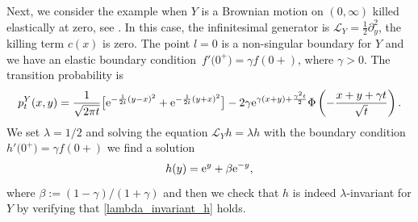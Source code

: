 \documentclass[pdftex]{sigma}
\numberwithin{equation}{section}
\theoremstyle{definition}
\def\L{{\mathcal L}}
\begin{document}
Next, we consider the example when $Y$ is a Brownian motion on $(0,\infty)$ killed elastically at zero,
see \cite[p.~125]{Borodin2002}. In this case, the infinitesimal generator is $\L_Y=\frac{1}{2}\partial_y^2$, the killing term $c(x)$ is zero. The point $l=0$ is a non-singular boundary for $Y$ and we have an elastic boundary condition~${f'\bigl(0^+\bigr)=\gamma f(0+)}$, where $\gamma>0$. The transition probability is
\[
p^Y_t(x,y)=\frac{1}{\sqrt{2\pi t}} \big[ {\rm e}^{-\frac{1}{2t}(y-x)^2}+
 {\rm e}^{-\frac{1}{2t}(y+x)^2} \big]- 2\gamma {\rm e}^{ \gamma(x+y)+\frac{\gamma^2t}{2} } \Phi\left( -\frac{x+y+\gamma t}{\sqrt{t}} \right).
\]
We set $\lambda=1/2$ and solving the equation $\L_Y h=\lambda h$ with the boundary condition $h'\bigl(0^+\bigr)=\gamma f(0+)$ we find a solution
\begin{equation}\label{h3}
h(y)={\rm e}^{y} + \beta {\rm e}^{-y},
\end{equation}
where $\beta:=(1-\gamma)/(1+\gamma)$ and then we check that $h$ is indeed $\lambda$-invariant for $Y$ by verifying that \eqref{lambda_invariant_h} holds.
\end{document}
